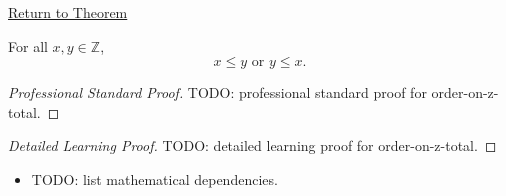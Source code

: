 \newpage
{}
\label{prf:order-on-z-total}

\begin{remark*}[Return]
\hyperref[thm:order-on-z-total]{Return to Theorem}
\end{remark*}

\begin{theorem*}
For all $x,y\in\mathbb{Z}$,
\[
x\le y\text{ or }y\le x.
\]
\end{theorem*}

\begin{proof}[Professional Standard Proof]
\LRAProofBodyStart
TODO: professional standard proof for order-on-z-total.
\end{proof}

\begin{proof}[Detailed Learning Proof]
\LRAProofBodyStart
TODO: detailed learning proof for order-on-z-total.
\end{proof}

\begin{remark*}
\end{remark*}

\begin{dependencies}
\begin{itemize}
  \item TODO: list mathematical dependencies.
\end{itemize}
\end{dependencies}

\clearpage
